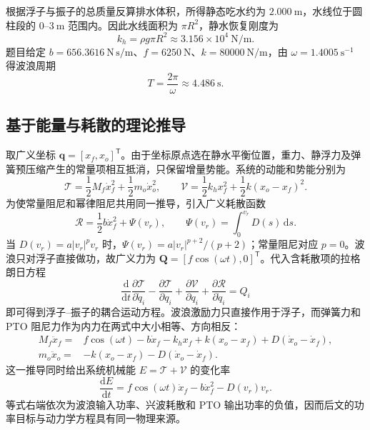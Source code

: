 \documentclass[withoutpreface]{../../../templates/CUMCM2026-Complete-LaTeX/cumcmthesis}
\begin{document}
根据浮子与振子的总质量反算排水体积，所得静态吃水约为 $2.000\ \mathrm{m}$，水线位于圆柱段的 $0$--$3\ \mathrm{m}$ 范围内。因此水线面积为 $\pi R^2$，静水恢复刚度为
\begin{equation}
  k_h=\rho g\pi R^2\approx3.156\times10^4\ \mathrm{N/m}.
  \label{eq:hydrostatic-stiffness}
\end{equation}
题目给定 $b=656.3616\ \mathrm{N\,s/m}$、$f=6250\ \mathrm{N}$、$k=80000\ \mathrm{N/m}$，由 $\omega=1.4005\ \mathrm{s^{-1}}$ 得波浪周期
\begin{equation}
  T=\frac{2\pi}{\omega}\approx4.486\ \mathrm{s}.
\end{equation}

\subsection{基于能量与耗散的理论推导}

取广义坐标 $\boldsymbol q=[x_f,x_o]^{\mathsf T}$。由于坐标原点选在静水平衡位置，重力、静浮力及弹簧预压缩产生的常量项相互抵消，只保留增量势能。系统的动能和势能分别为
\begin{equation}
  \mathcal T=\frac12M_f\dot x_f^2+\frac12m_o\dot x_o^2,
  \qquad
  \mathcal V=\frac12k_hx_f^2+\frac12k(x_o-x_f)^2.
  \label{eq:q1-energy}
\end{equation}
为使常量阻尼和幂律阻尼共用同一推导，引入广义耗散函数
\begin{equation}
  \mathcal R=\frac12b\dot x_f^2+\Psi(v_r),
  \qquad
  \Psi(v_r)=\int_0^{v_r}D(s)\,\mathrm ds.
  \label{eq:q1-dissipation}
\end{equation}
当 $D(v_r)=a|v_r|^pv_r$ 时，$\Psi(v_r)=a|v_r|^{p+2}/(p+2)$；常量阻尼对应 $p=0$。波浪只对浮子直接做功，故广义力为 $\boldsymbol Q=[f\cos(\omega t),0]^{\mathsf T}$。代入含耗散项的拉格朗日方程
\begin{equation}
  \frac{\mathrm d}{\mathrm dt}\frac{\partial\mathcal T}{\partial\dot q_i}
  -\frac{\partial\mathcal T}{\partial q_i}
  +\frac{\partial\mathcal V}{\partial q_i}
  +\frac{\partial\mathcal R}{\partial\dot q_i}=Q_i
  \label{eq:q1-lagrange}
\end{equation}
即可得到浮子--振子的耦合运动方程。波浪激励力只直接作用于浮子，而弹簧力和 PTO 阻尼力作为内力在两式中大小相等、方向相反：
\begin{align}
  M_f\ddot x_f={}&f\cos(\omega t)-b\dot x_f-k_hx_f
  +k(x_o-x_f)+D(\dot x_o-\dot x_f),
  \label{eq:float-motion}\\
  m_o\ddot x_o={}&-k(x_o-x_f)-D(\dot x_o-\dot x_f).
  \label{eq:oscillator-motion}
\end{align}
这一推导同时给出系统机械能 $E=\mathcal T+\mathcal V$ 的变化率
\begin{equation}
  \frac{\mathrm dE}{\mathrm dt}
  =f\cos(\omega t)\dot x_f-b\dot x_f^2-D(v_r)v_r.
  \label{eq:q1-energy-balance}
\end{equation}
等式右端依次为波浪输入功率、兴波耗散和 PTO 输出功率的负值，因而后文的功率目标与动力学方程具有同一物理来源。
\end{document}
